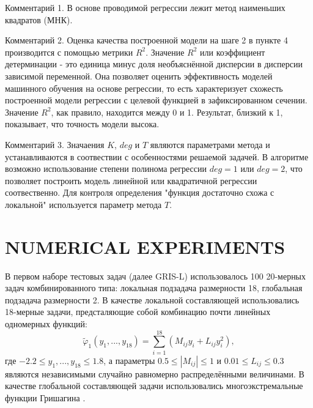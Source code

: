 \documentclass{aip-cp}
\begin{document}
Комментарий 1. В основе проводимой регрессии лежит метод наименьших квадратов (МНК).
%

Комментарий 2. Оценка качества построенной модели на шаге 2 в пункте 4 производится с помощью метрики $R^2$. Значение $R^2$ или коэффициент детерминации - это единица минус доля необъяснённой дисперсии в дисперсии зависимой переменной. Она позволяет оценить эффективность моделей машинного обучения на основе регрессии, то есть характеризует схожесть построенной модели регрессии с целевой функцией в зафиксированном сечении. Значение $R^2$, как правило, находится между 0 и 1. Результат, близкий к 1, показывает, что точность модели высока.

Комментарий 3. Значаения  $K$, $deg$ и $T$ являются параметрами метода и устанавливаются в соотвествии с особенностями решаемой задачей. В алгоритме возможно использование степени полинома регрессии $deg = 1$ или $deg = 2$, что позволяет построить модель линейной или квадратичной регрессии соотвественно.  Для контроля определения "функция достаточно схожа с локальной" используется параметр метода $T$.

\section{NUMERICAL EXPERIMENTS}

В первом наборе тестовых задач (далее GRIS-L) использовалось 100 20-мерных задач комбинированного типа: локальная подзадача размерности 18, глобальная подзадача размерности 2. В качестве локальной составляющей использовались 18-мерные задачи, предсталяющие собой комбинацию почти линейных одномерных функций:
\begin{equation}\label{X2_problem}
\widetilde{\varphi}_1(y_1, ... , y_{18}) = \sum_{i=1}^{18} (M_{ij} y_i + L_{ij} y_i^2),
\end{equation}
где $-2.2 \leq y_1, .. ., y_{18} \leq 1.8$, а параметры $0.5 \leq |M_{ij}| \leq 1$ и $0.01 \leq L_{ij} \leq 0.3$  являются независимыми случайно равномерно распределёнными величинами.
В качестве глобальной составляющей задачи использовались многоэкстремальные функции Гришагина \cite{}.
\end{document}
